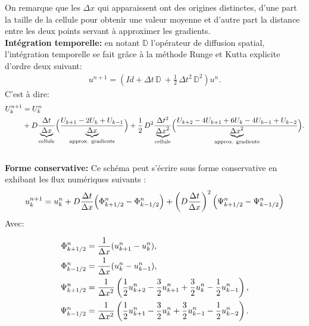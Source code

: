             On remarque que les $\Delta x$ qui apparaissent ont des origines distinctes, d'une part la taille de la cellule pour obtenir une valeur moyenne et 
            d'autre part la distance entre les deux points servant à approximer les gradients.\\
            \textbf{Intégration temporelle: } en notant $\mathbb{D}$ l'opérateur de diffusion spatial, l'intégration temporelle se fait grâce à la méthode Runge et Kutta explicite d'ordre deux suivant: 
            \begin{align}
                u^{n+1} = \left(Id+ \Delta t\, \mathbb{D} \ + \frac{1}{2} \, \Delta t^2 \, \mathbb{D}^2 \right) u^n.
            \end{align}
            C'est à dire:
            \begin{align}
                U_k^{n+1} &= U_k^n\\ \notag
                &+ D \frac{\Delta t}{\underbrace{\Delta x}_{\text{cellule}}} \Bigl(\frac{U_{k+1} - 2 U_{k} + U_{k-1}}{\underbrace{\Delta x}_{\text{approx. gradients}}}\Bigr)%
                +\frac{1}{2} \,D^2 \frac{\Delta t^2}{\underbrace{\Delta x^2}_{\text{cellule}}} \Bigl(\frac{U_{k+2} -4 U_{k+1}  +6 U_{k} -4 U_{k-1} + U_{k-2}}{\underbrace{\Delta x^2}_{\text{approx. gradients}}}\Bigr).
            \end{align}\\
            \textbf{Forme conservative: }
            Ce schéma peut s'écrire sous forme conservative en exhibant les flux numériques suivants :
            \begin{align}\label{eq:contrib_2:schema_flux}
                u^{n+1}_k = u^n_k +  D \frac{\Delta t}{\Delta x} \Bigl( \Phi^n_{k+1/2} - \Phi^n_{k-1/2} \Bigr)  + \left( D \frac{\Delta t}{\Delta x} \right)^2 \Bigl( \Psi^n_{k+1/2} - \Psi^n_{k-1/2} \Bigr) 
            \end{align}
            Avec:

            \begin{align}
                \Phi^n_{k+1/2} &= \frac{1}{\Delta x}(u^n_{k+1} - u^n_{k}),\\
                \Phi^n_{k-1/2} &= \frac{1}{\Delta x}(u^n_{k} - u^n_{k-1}),\\\notag
                \Psi^n_{k+1/2} &= \frac{1}{\Delta x^2} \left(\frac{1}{2} u^n_{k+2} -  \frac{3}{2}  u^n_{k+1} +  \frac{3}{2} u^n_{k} -  \frac{1}{2} u^n_{k-1}\right),\\\notag
                \Psi^n_{k-1/2} &= \frac{1}{\Delta x^2} \left(\frac{1}{2} u^n_{k+1} -  \frac{3}{2}  u^n_{k}   +  \frac{3}{2}u^n_{k-1} -  \frac{1}{2}u^n_{k-2}\right).\notag
            \end{align}
\newpage
